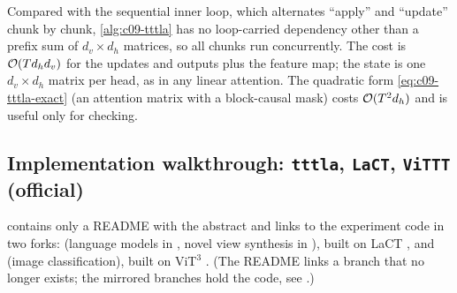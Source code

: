 Compared with the sequential inner loop, which alternates ``apply'' and ``update'' chunk by
chunk, \cref{alg:c09-tttla} has no loop-carried dependency other than a prefix sum of
$d_v\times d_h$ matrices, so all chunks run concurrently. The cost is $\mathcal{O}(T d_h d_v)$ for the
updates and outputs plus the feature map; the state is one $d_v\times d_h$ matrix per head, as
in any linear attention. The quadratic form \eqref{eq:c09-tttla-exact} (an attention matrix with
a block-causal mask) costs $\mathcal{O}(T^2 d_h)$ and is useful only for checking.

\subsection{Implementation walkthrough: \texttt{tttla}, \texttt{LaCT}, \texttt{ViTTT} (official)}

\begin{implnote}[title={In the code: where the experiments live}]
 contains only a README with the abstract and links to the experiment
code in two forks:  (language models in , novel
view synthesis in ), built on LaCT \citep{c09-zhang2025lact}, and
 (image classification), built on ViT$^3$ \citep{c09-han2025vit3}.
(The README links a  branch that no longer exists; the mirrored  branches
hold the code, see .)
\end{implnote}

